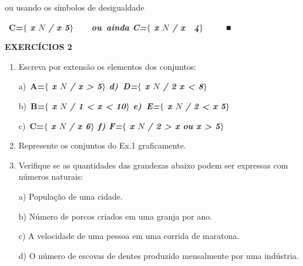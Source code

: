 \documentclass[12pt]{article}
\renewcommand{\_}{\kern-1.5pt\textunderscore\kern-1.5pt}
\begin{document}
\begin{adjustwidth}{0.63in}{0.0in}
\tab ou usando os símbolos de desigualdade  \par

\end{adjustwidth}

\begin{adjustwidth}{0.63in}{0.0in}
\  \tab \textbf{C=$ \{ $ \textit{x   \( N \)  / x  5$ \} $ \ \ \ ou\ ainda   C=$ \{ $ x   \( N \)  / x  4$ \} $ \ \ \ \  ■}}\par

\end{adjustwidth}

\tab 
\vspace{\baselineskip}\textbf{EXERCÍCIOS 2}\par

\begin{enumerate}
	\item Escreva por extensão os elementos dos conjuntos:\par

a)\  \textbf{A=$ \{ $ \textit{x   \( N \)  / x > 5$ \} $ \tab \tab \tab d)\  D=$ \{ $ x   \( N \)  / 2  x < 8$ \} $ }}\par

b)\  \textbf{B=$ \{ $ \textit{x   \( N \)  / 1 < x < 10$ \} $ \tab \tab e)\  E=$ \{ $ x   \( N \)  / 2 < x  5$ \} $ }}\par

c)\  \textbf{C=$ \{ $ \textit{x   \( N \)  / x  6$ \} $ \tab \tab \tab f)  F=$ \{ $ x   \( N \)  / 2 > x ou x > 5$ \} $ }}\par

	\item Represente os conjuntos do Ex.1 graficamente.\par

	\item Verifique se as quantidades das grandezas abaixo podem ser expressas com números naturais:\par

a) População de uma cidade.\par

b) Número de porcos criados em uma granja por ano.\par

c) A velocidade de uma pessoa em uma corrida de maratona.\par

d) O número de escovas de dentes produzido mensalmente por uma indústria.\par


\end{enumerate}
\end{document}
